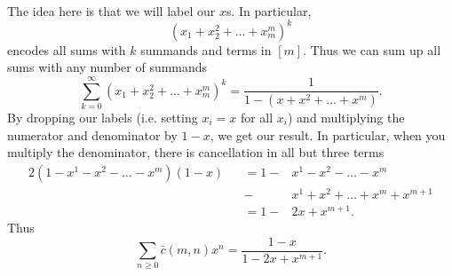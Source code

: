 \documentclass{article}
\newenvironment{solution}[1][Solution.]{\begin{trivlist}
\item[\hskip \labelsep {\bfseries #1}]}{\end{trivlist}}
\begin{document}
\begin{solution} \text{} \\
  The idea here is that we will label our $x$s. In particular, \[
    (x_1 + x_2^2 + \hdots + x_m^m)^k
  \] encodes all sums with $k$ summands and terms in $[m]$.
  Thus we can sum up all sums with any number of summands \[
    \sum_{k=0}^\infty (x_1 + x_2^2 + \hdots + x_m^m)^k =
    \frac{1}{1 - (x + x^2 + \hdots + x^m)}.
  \]
  By dropping our labels (i.e. setting $x_i = x$ for all $x_i$) and multiplying
  the numerator and denominator by $1-x$, we get our result.
  In particular, when you multiply the denominator, there is cancellation in
  all but three terms
  \begin{alignat*}{2}
    (1 - x^1 - x^2 - \hdots - x^m)(1 - x) &&= 1 - &x^1 - x^2 - \hdots - x^m \\
                                          &&    - &x^1 + x^2 + \hdots + x^m + x^{m+1} \\
                                          &&= 1 - &2x + x^{m+1}.
  \end{alignat*}
  Thus \[
    \sum_{n \geq 0}\bar c(m,n)x^n = \frac{1-x}{1-2x+x^{m+1}}.
  \]
\end{solution}
\end{document}
